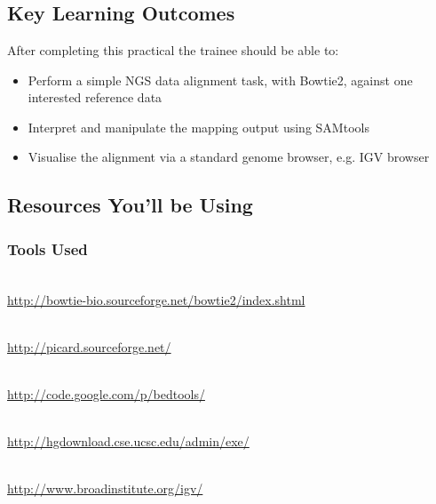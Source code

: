 
\chapter{\moduleTitle}
\newpage

\section{Key Learning Outcomes}

After completing this practical the trainee should be able to:
\begin{itemize}
  \item Perform a simple NGS data alignment task, with Bowtie2, against one interested reference data
  \item Interpret and manipulate the mapping output using SAMtools
  \item Visualise the alignment via a standard genome browser, e.g. IGV browser
\end{itemize}

\section{Resources You'll be Using}
 
\subsection{Tools Used}
\begin{description}[style=multiline,labelindent=0cm,align=left,leftmargin=0.5cm]
  \item[Bowtie2]\hfill\\
  	\url{http://bowtie-bio.sourceforge.net/bowtie2/index.shtml}
  \item[Samtools]\hfill\\
  	\url{http://picard.sourceforge.net/}
  \item[BEDTools]\hfill\\
  	\url{http://code.google.com/p/bedtools/}
  \item[UCSC tools]\hfill\\
  	\url{http://hgdownload.cse.ucsc.edu/admin/exe/}  
  \item[IGV genome browser]\hfill\\
  	\url{http://www.broadinstitute.org/igv/}
\end{description}

